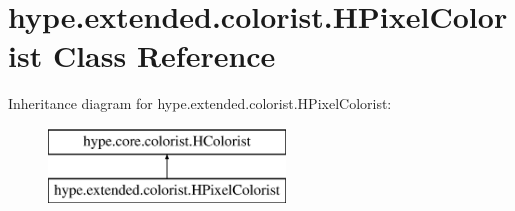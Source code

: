 \hypertarget{classhype_1_1extended_1_1colorist_1_1_h_pixel_colorist}{\section{hype.\-extended.\-colorist.\-H\-Pixel\-Colorist Class Reference}
\label{classhype_1_1extended_1_1colorist_1_1_h_pixel_colorist}
}
Inheritance diagram for hype.\-extended.\-colorist.\-H\-Pixel\-Colorist\-:\begin{figure}[H]
\begin{center}
\leavevmode
\includegraphics[height=2.000000cm]{classhype_1_1extended_1_1colorist_1_1_h_pixel_colorist}
\end{center}
\end{figure}
